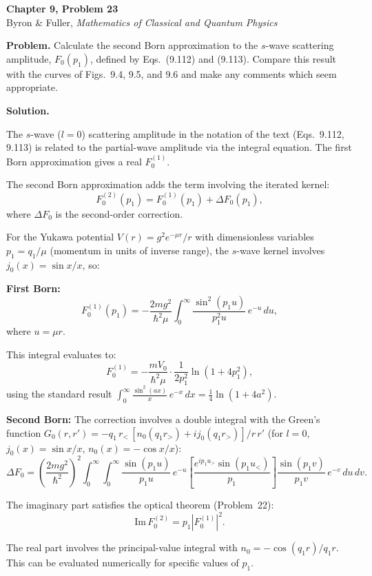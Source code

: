 \documentclass[12pt]{article}
\begin{document}
\begin{center}
{\Large\bfseries Chapter 9, Problem 23}\\[6pt]
Byron \& Fuller, \textit{Mathematics of Classical and Quantum Physics}
\end{center}

\bigskip

\textbf{Problem.} Calculate the second Born approximation to the $s$-wave scattering amplitude, $F_0(p_1)$, defined by Eqs.~(9.112) and (9.113). Compare this result with the curves of Figs.~9.4, 9.5, and 9.6 and make any comments which seem appropriate.

\bigskip
\textbf{Solution.}

The $s$-wave ($l = 0$) scattering amplitude in the notation of the text (Eqs.~9.112, 9.113) is related to the partial-wave amplitude via the integral equation. The first Born approximation gives a real $F_0^{(1)}$.

The second Born approximation adds the term involving the iterated kernel:
\[
F_0^{(2)}(p_1) = F_0^{(1)}(p_1) + \Delta F_0(p_1),
\]
where $\Delta F_0$ is the second-order correction.

For the Yukawa potential $V(r) = g^2 e^{-\mu r}/r$ with dimensionless variables $p_1 = q_1/\mu$ (momentum in units of inverse range), the $s$-wave kernel involves $j_0(x) = \sin x / x$, so:

\textbf{First Born:}
\[
F_0^{(1)}(p_1) = -\frac{2m g^2}{\hbar^2 \mu}\int_0^\infty \frac{\sin^2(p_1 u)}{p_1^2 u}\,e^{-u}\,du,
\]
where $u = \mu r$.

This integral evaluates to:
\[
F_0^{(1)} = -\frac{mV_0}{\hbar^2\mu}\cdot\frac{1}{2p_1^2}\ln(1 + 4p_1^2),
\]
using the standard result $\int_0^\infty \frac{\sin^2(ax)}{x}\,e^{-x}\,dx = \frac{1}{4}\ln(1+4a^2)$.

\textbf{Second Born:} The correction involves a double integral with the Green's function $G_0(r,r') = -q_1\,r_<\,[n_0(q_1 r_>) + i j_0(q_1 r_>)]/r\,r'$ (for $l=0$, $j_0(x) = \sin x/x$, $n_0(x) = -\cos x/x$):
\[
\Delta F_0 = \left(\frac{2mg^2}{\hbar^2}\right)^2\!\!\int_0^\infty\!\!\int_0^\infty \frac{\sin(p_1 u)}{p_1 u}\,e^{-u}\left[\frac{e^{ip_1 u_>}\sin(p_1 u_<)}{p_1}\right]\frac{\sin(p_1 v)}{p_1 v}\,e^{-v}\,du\,dv.
\]

The imaginary part satisfies the optical theorem (Problem~22):
\[
\mathrm{Im}\,F_0^{(2)} = p_1|F_0^{(1)}|^2.
\]

The real part involves the principal-value integral with $n_0 = -\cos(q_1 r)/q_1 r$. This can be evaluated numerically for specific values of $p_1$.
\end{document}
